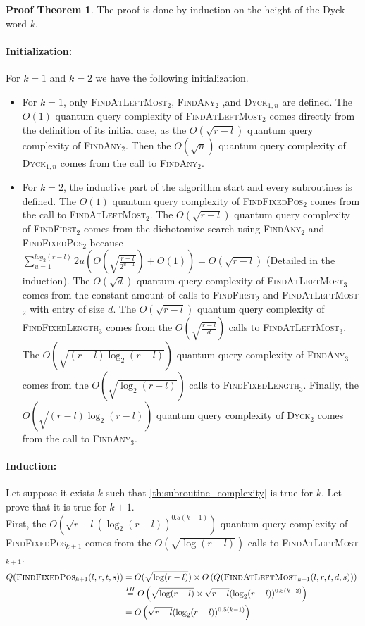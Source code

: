 \documentclass[11pt,a4paper]{article}
\newcommand{\Dyck}[1]{\textsc{Dyck$_{#1}$}}
\newcommand{\FA}[1]{\textsc{FindAny$_{#1}$}}
\newcommand{\FFL}[1]{\textsc{FindFixedLength$_{#1}$}}
\newcommand{\FFP}[1]{\textsc{FindFixedPos$_{#1}$}}
\newcommand{\FALM}[1]{\textsc{FindAtLeftMost$_{#1}$}}
\newcommand{\FF}[1]{\textsc{FindFirst$_{#1}$}}
\newcommand{\hered}[1]{\paragraph*{Induction:}{#1}}
\newcommand{\init}[1]{\paragraph*{Initialization:}{#1}}
\theoremstyle{definition}
\theoremstyle{plain}
\theoremstyle{definition}
\newtheorem{tproof}{Proof Theorem}[section]
\begin{document}
\begin{appendix}
    \begin{tproof} The proof is done by induction on the height of the Dyck word $k$.
        \init{For $k=1$ and $k=2$ we have the following initialization. \\
            \begin{itemize}
                \item For $k=1$, only \FALM{2}, \FA{2} ,and \Dyck{1,n} are defined. The $O(1)$ quantum query complexity
                      of \FALM{2} comes directly from the definition of its initial case, as the $O(\sqrt{r-l})$ quantum
                      query complexity of \FA{2}. Then the $O\left(\sqrt{n}\right)$ quantum query complexity of \Dyck{1,n} comes from
                      the call to \FA{2}.
                \item For $k=2$, the inductive part of the algorithm start and every subroutines is defined. The $O(1)$
                      quantum query complexity of \FFP{2} comes from the call to \FALM{2}.
                      The $O\left(\sqrt{r-l}\right)$ quantum query complexity of \FF{2} comes from the dichotomize search using \FA{2} and
                      \FFP{2} because $\sum_{u=1}^{log_2(r-l)}2u\left(O\left(\sqrt{\frac{r-l}{2^{u-1}}}\right)+O(1)\right) = O(\sqrt{r-l})$
                      (Detailed in the induction). The $O(\sqrt{d})$ quantum query complexity of \FALM{3} comes from the
                      constant amount of calls to \FF{2} and \FALM{2} with entry of size $d$. The $O(\sqrt{r-l})$ quantum query
                      complexity of \FFL{3} comes from the $O\left(\sqrt{\frac{r-l}{d}}\right)$ calls to \FALM{3}. The $O\left(\sqrt{(r-l)\log_2(r-l)}\right)$
                      quantum query complexity of \FA{3} comes from the $O\left(\sqrt{\log_2(r-l)}\right)$ calls to \FFL{3}. Finally, the
                      $O\left(\sqrt{(r-l)\log_2(r-l)}\right)$ quantum query complexity of \Dyck{2} comes from the call to \FA{3}.
            \end{itemize}
        }
        \hered{Let suppose it exists $k$ such that \autoref{th:subroutine_complexity} is
            true for $k$. Let prove that it is true for $k+1$. \\

            First, the $O\left(\sqrt{r-l}(\log_2(r-l))^{0.5(k-1)}\right)$ quantum query complexity of \FFP{k+1} comes from
            the $O\left(\sqrt{\log(r-l)}\right)$ calls to \FALM{k+1}.
            \begin{align*}
                Q(\textrm{\FFP{k+1}}(l, r, t, s)) & = O(\sqrt{\log(r-l)}) \times O\left(Q(\textrm{\FALM{k+1}}(l, r, t, d, s))\right)\            \\
                                                  & \overset{IH}{=} O \left( \sqrt{\log(r-l)} \times \sqrt{r-l}(\log_2(r-l))^{0.5(k-2)}  \right) \\
                                                  & = O \left( \sqrt{r-l}(\log_2(r-l))^{0.5(k-1)} \right)
            \end{align*}

}
\end{tproof}
\end{appendix}
\end{document}
